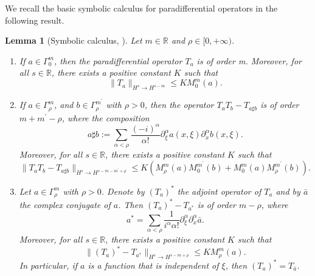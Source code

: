 \documentclass[10pt]{amsart}
\newtheorem{lemma}[theorem]{Lemma}
\theoremstyle{remark}
\theoremstyle{definition}
\numberwithin{equation}{section}
\begin{document}
We recall the basic symbolic calculus for paradifferential operators in the following result.
\begin{lemma}[Symbolic calculus, \cite{MR2418072}]
Let $m\in \mathbb{R}$ and $\rho\in [0, +\infty)$.
\begin{enumerate}
\item If $a\in \Gamma^m_0$, then the paradifferential operator $T_a$ is of order m. Moreover, for all $s\in \mathbb{R}$, there exists a positive constant $K$ such that
\begin{equation}
\|T_a\|_{H^s\rightarrow H^{s-m}} \leq K M^m_0(a). \label{TABound}
\end{equation}
\item If $a\in \Gamma^m_\rho$, and $b\in \Gamma^{m^{'}}_\rho$ with $\rho>0$, then the operator $T_a T_b -T_{a\sharp b}$ is of order $m+m^{'}-\rho$, where the composition
\begin{equation*}
    a \sharp b := \sum_{\alpha<\rho} \frac{(-i)^\alpha}{\alpha !} \partial^\alpha_\xi a(x,\xi) \partial^\alpha_x b(x,\xi).
\end{equation*}
Moreover,  for all $s\in \mathbb{R}$, there exists a positive constant $K$ such that
\begin{equation}
  \|T_a T_b-T_{a\sharp b} \|_{H^s \rightarrow H^{s-m-m^{'}+\rho}} \leq K\left(M^m_\rho(a)M^{m^{'}}_0(b) + M^m_0(a)M^{m^{'}}_\rho(b)\right). \label{CompositionPara}
\end{equation}
\item Let $a\in \Gamma^m_\rho$ with $\rho > 0$. 
Denote by $(T_a)^{*}$ the adjoint operator of $T_a$ and by $\bar{a}$ the complex conjugate of $a$.
Then $(T_a)^{*} -T_{a^{*}}$ is of order $m - \rho$, where 
\begin{equation*}
    a^{*} =  \sum_{\alpha<\rho} \frac{1}{i^\alpha \alpha !} \partial^\alpha_\xi \partial^\alpha_x \bar{a}.
\end{equation*}
Moreover,  for all $s\in \mathbb{R}$, there exists a positive constant $K$ such that
\begin{equation}
 \|(T_a)^{*} -T_{a^{*}} \|_{H^s \rightarrow H^{s-m+\rho}} \leq KM^m_\rho(a). \label{AdjointBound}
\end{equation}
In particular, if $a$ is a function that is independent of $\xi$, then  $(T_a)^* = T_{\bar{a}}$.
\end{enumerate}
\end{lemma}
\end{document}
